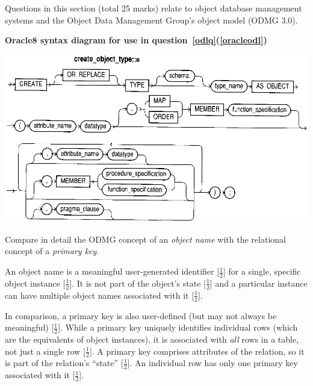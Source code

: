 \documentclass{ouexam}
\begin{document}
\begin{examsection}{25}{}{Questions in this section (total 25 marks) relate to object
database management systems and the Object Data Management Group's object model
(ODMG 3.0).}
\newpage

\begin{center}
	\textbf{Oracle8 syntax diagram for use in
	question~\ref{odlq}(\ref{oracleodl})}
	
	\bigskip
	\includegraphics{CreateObjectType}
	\bigskip\bigskip
\end{center}


\begin{question}{15}


	\begin{subquestion}{4}
		Compare in detail the ODMG concept of an \emph{object name} with the
		relational concept of a \emph{primary key}.
		\begin{marking}
			An object name is a meaningful user-generated identifier
			[$\frac{1}{2}$] for a single, specific object instance
			[$\frac{1}{2}$]. It is not part of the object's state
			[$\frac{1}{2}$] and a particular instance can have multiple object
			names associated with it [$\frac{1}{2}$].

			In comparison, a primary key is also user-defined (but may not
			always be meaningful) [$\frac{1}{2}$]. While a primary key uniquely
			identifies individual rows (which are the equivalents of object
			instances), it is associated with \emph{all} rows in a table, not
			just a single row [$\frac{1}{2}$]. A primary key comprises
			attributes of the relation, so it is part of the relation's
			``state'' [$\frac{1}{2}$]. An individual row has only one primary
			key associated with it [$\frac{1}{2}$].
		\end{marking}
	\end{subquestion}
	

\end{question}
\end{examsection}
\end{document}
